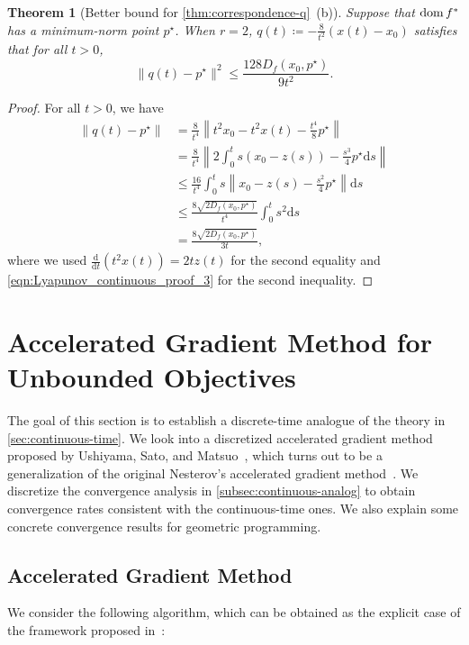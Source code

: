 \documentclass[11pt,a4paper]{article}
\theoremstyle{definition}
\theoremstyle{plain}
\newtheorem{thm}{Theorem}[section]
\newcommand{\rmd}{{\mathrm{d}}}
\newcommand{\dom}{\mathop{\rm dom}}
\begin{document}
\begin{thm}[Better bound for \cref{thm:correspondence-q}~(b)]
    \label{thm:NAG_continuous-q}
    Suppose that $\dom f^\ast$ has a minimum-norm point $p^\star$.
    When $r = 2$, $q(t) \coloneqq -\frac8{t^2}(x(t)- x_0)$ satisfies that for all $t > 0$,
    \[
        \|q(t) - p^\star\|^2 \le \frac{128D_f(x_0, p^\star)}{9t^2}.
    \]
\end{thm}
\begin{proof}
    For all $t > 0$, we have
    \begin{align*}
        \|q(t) - p^\star\|
        &= \frac{8}{t^4}\left\|t^2x_0 - t^2x(t) - \frac{t^4}8p^\star\right\|\\
        &= \frac{8}{t^4}\left\|2\int_0^ts\left(x_0 - z(s)\right) - \frac{s^3}4p^\star\rmd s\right\|\\
        &\le \frac{16}{t^4}\int_0^ts\left\|x_0 - z(s) - \frac{s^2}4p^\star\right\|\rmd s\\
        &\le \frac{8\sqrt{2D_f(x_0, p^\star)}}{t^4}\int_0^ts^2\rmd s\\
        &= \frac{8\sqrt{2D_f(x_0, p^\star)}}{3t},
    \end{align*}
    where we used $\frac{\rmd}{\rmd t}\left(t^2x(t)\right) = 2tz(t)$ for the second equality and \eqref{eqn:Lyapunov_continuous_proof_3} for the second inequality.
\end{proof}

\section{Accelerated Gradient Method for Unbounded Objectives}\label{sec:discrete-time}
The goal of this section is to establish a discrete-time analogue of the theory in \cref{sec:continuous-time}.
We look into a discretized accelerated gradient method proposed by Ushiyama, Sato, and Matsuo~\cite{USM2023}, which turns out to be a generalization of the original Nesterov's accelerated gradient method~\cite{Nesterov1983}.
We discretize the convergence analysis in \cref{subsec:continuous-analog} to obtain convergence rates consistent with the continuous-time ones.
We also explain some concrete convergence results for geometric programming.

\subsection{Accelerated Gradient Method}
We consider the following algorithm, which can be obtained as the explicit case of the framework proposed in~\cite[Theorem~5.4]{USM2023}:
\end{document}
